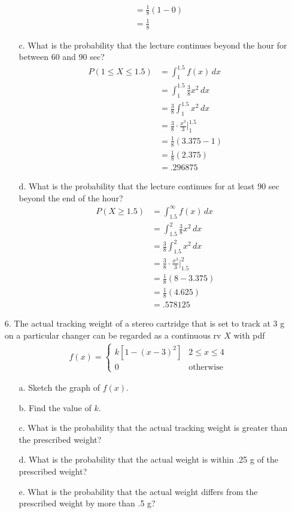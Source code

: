 \documentclass[letterpaper,12pt]{article}
\begin{document}
\begin{enumerate}
\begin{enumerate}
\begin{align*}
          &= \frac{1}{8}(1 - 0) \\
          &= \frac{1}{8}
        \end{align*}
      \item[c.]
        What is the probability that the lecture continues beyond the hour for between 60 and 90 sec?
        \begin{align*}
          P(1 \le X \le 1.5) &= \int_{1}^{1.5} f(x)\,dx \\
          &= \int_{1}^{1.5} \frac{3}{8}x^2\,dx \\
          &= \frac{3}{8} \int_{1}^{1.5} x^2\,dx \\
          &= \frac{3}{8} \cdot \frac{x^3}{3}\bigg\rvert_{1}^{1.5} \\
          &= \frac{1}{8}(3.375 - 1) \\
          &= \frac{1}{8}(2.375) \\
          &= .296875
        \end{align*}
      \item[d.]
        What is the probability that the lecture continues for at least 90 sec beyond the end of the hour?
        \begin{align*}
          P(X \ge 1.5) &= \int_{1.5}^{\infty} f(x)\,dx \\
          &= \int_{1.5}^{2} \frac{3}{8}x^2\,dx \\
          &= \frac{3}{8} \int_{1.5}^{2} x^2\,dx \\
          &= \frac{3}{8} \cdot \frac{x^3}{3}\bigg\rvert_{1.5}^{2} \\
          &= \frac{1}{8}(8 - 3.375) \\
          &= \frac{1}{8}(4.625) \\
          &= .578125
        \end{align*}
    \end{enumerate}
  \item[6.]
    The actual tracking weight of a stereo cartridge that is set to track at 3 g on a particular changer can be regarded as a continuous rv $X$ with pdf
    \begin{align*}
      f(x) = \begin{cases}
        k[1 - (x - 3)^2] & 2 \le x \le 4 \\
        0                & \text{otherwise}
      \end{cases}
    \end{align*}
    \begin{enumerate}
      \item[a.]
        Sketch the graph of $f(x)$.
      \item[b.]
        Find the value of $k$.
      \item[c.]
        What is the probability that the actual tracking weight is greater than the prescribed weight?
      \item[d.]
        What is the probability that the actual weight is within .25 g of the prescribed weight?
      \item[e.]
        What is the probability that the actual weight differs from the prescribed weight by more than .5 g?
    \end{enumerate}
  \end{enumerate}
\end{document}
